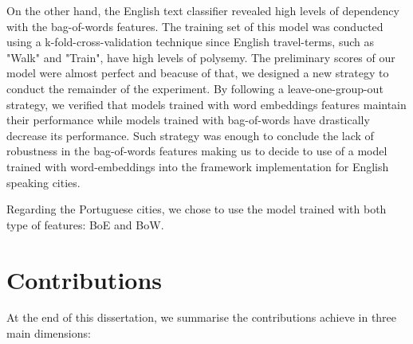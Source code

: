 On the other hand, the English text classifier revealed high levels of dependency with the bag-of-words features. The training set of this model was conducted using a \gls{k-fold-cross-validation} technique since English travel-terms, such as "Walk" and "Train", have high levels of polysemy. The preliminary scores of our model were almost perfect and beacuse of that, we designed a new strategy to conduct the remainder of the experiment. By following a leave-one-group-out strategy, we verified that models trained with word embeddings features maintain their performance while models trained with bag-of-words have drastically decrease its performance. Such strategy was enough to conclude the lack of robustness in the bag-of-words features making us to decide to use of a model trained with word-embeddings into the framework implementation for English speaking cities. 

Regarding the Portuguese cities, we chose to use the model trained with both type of features: \gls{BoE} and \gls{BoW}.


\section{Contributions}
\label{seCc:contributions}
At the end of this dissertation, we summarise the contributions achieve in three main dimensions:

